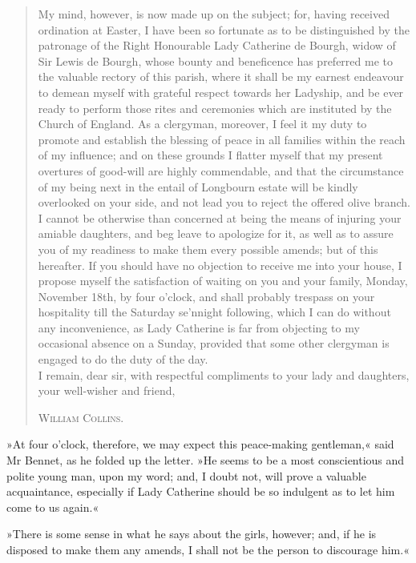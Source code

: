 \begin{quotation}
My mind, however, is now made up on the subject; for, having received ordination at Easter, I have been so fortunate as to be distinguished by the patronage of the Right Honourable Lady Catherine de Bourgh, widow of Sir Lewis de Bourgh, whose bounty and beneficence has preferred me to the valuable rectory of this parish, where it shall be my earnest endeavour to demean myself with grateful respect towards her Ladyship, and be ever ready to perform those rites and ceremonies which are instituted by the Church of England. As a clergyman, moreover, I feel it my duty to promote and establish the blessing of peace in all families within the reach of my influence; and on these grounds I flatter myself that my present overtures of good-will are highly commendable, and that the circumstance of my being next in the entail of Longbourn estate will be kindly overlooked on your side, and not lead you to reject the offered olive branch. I cannot be otherwise than concerned at being the means of injuring your amiable daughters, and beg leave to apologize for it, as well as to assure you of my readiness to make them every possible amends; but of this hereafter. If you should have no objection to receive me into your house, I propose myself the satisfaction of waiting on you and your family, Monday, November 18th, by four o'clock, and shall probably trespass on your hospitality till the Saturday se'nnight following, which I can do without any inconvenience, as Lady Catherine is far from objecting to my occasional absence on a Sunday, provided that some other clergyman is engaged to do the duty of the day.\\

{\indent I remain, dear sir, with respectful compliments to your lady and daughters, your well-wisher and friend,}\\
\begin{flushright}
\textsc{William Collins.}
\end{flushright}
\end{quotation}


»At four o'clock, therefore, we may expect this peace-making gentleman,« said Mr Bennet, as he folded up the letter. »He seems to be a most conscientious and polite young man, upon my word; and, I doubt not, will prove a valuable acquaintance, especially if Lady Catherine should be so indulgent as to let him come to us again.«

»There is some sense in what he says about the girls, however; and, if he is disposed to make them any amends, I shall not be the person to discourage him.«


